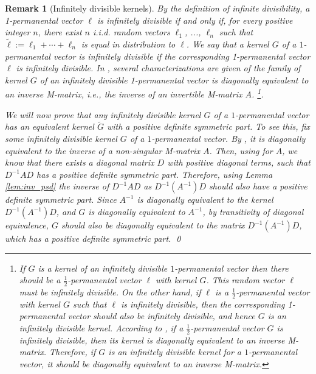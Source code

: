 \documentclass[a4paper, 11pt]{article}
\newtheorem{rem}{Remark}[thm]
\begin{document}
\vspace{.3em} \begin{rem}[Infinitely divisible kernels]
\label{rem-infdiv}
By the definition of infinite divisibility, a 1-permanental vector $\ell$ is infinitely divisible if and only if, for every positive integer $n$, there exist $n$ i.i.d. random vectors $\ell_1$, ..., $\ell_n$ such that $\tilde{\ell}:= \ell_1 + \cdots + \ell_n$ is equal in distribution to $\ell$. We say that a kernel $G$ of a $1$-permanental vector is infinitely divisible if the corresponding 1-permanental vector $\ell$ is infinitely divisible. In \cite{ek09}, several characterizations are given of the family of %
kernel $G$ of an infinitely divisible 1-permanental vector is diagonally equivalent to an inverse M-matrix, i.e., the inverse of an invertible M-matrix $A$.
\footnote{If $G$ is
a kernel of an infinitely divisible $1$-permanental vector then there should be a $\frac{1}{2}$-permanental vector $\ell$ with kernel $G$.
This random vector $\ell$ must be infinitely divisible. On the other hand, if $\ell$ is a $\frac{1}{2}$-permanental vector with kernel $G$ such that $\ell$ is infinitely divisible, then the corresponding 1-permanental vector should also be infinitely divisible, and hence $G$ is an infinitely divisible kernel. According to \cite[Lemma 4.2]{ek09}, if a $\frac{1}{2}$-permanental vector $G$ is infinitely divisible, then its kernel is diagonally equivalent to an inverse M-matrix. Therefore, if $G$ is an infinitely divisible kernel for a $1$-permanental vector, it should be diagonally equivalent to an inverse M-matrix.}.

We will now prove that any infinitely divisible kernel $G$ of a $1$-permanental vector has an equivalent kernel $\tilde{G}$ with a positive definite symmetric part. To see this, fix some infinitely divisible kernel $G$ of a $1$-permanental vector. By \cite[Lemma 4.2]{ek09}, it is diagonally equivalent to the inverse of a non-singular M-matrix $A$. Then, using \cite[Condition $I_{26}$]{plemmons77} for $A$, we know that there exists a diagonal matrix $D$ with positive diagonal terms, such that $D^{-1}AD$ has a positive definite symmetric part. Therefore, using Lemma \ref{lem:inv_psd} the inverse of $D^{-1}AD$ as $D^{-1}(A^{-1})D$ should also have a positive definite symmetric part. Since $A^{-1}$ is diagonally equivalent to the kernel $D^{-1}(A^{-1})D$, and $G$ is diagonally equivalent to $A^{-1}$, by transitivity of diagonal equivalence, $G$ should also be diagonally equivalent to the matrix $D^{-1}(A^{-1})D$, which has a positive definite symmetric part. \qed
\end{rem}
\end{document}
